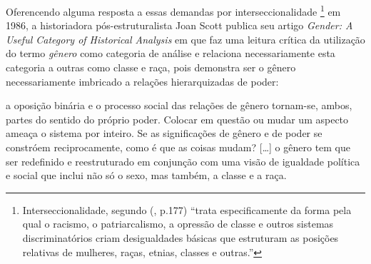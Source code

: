 
Oferencendo alguma resposta a essas demandas por interseccionalidade
\footnote{Interseccionalidade, segundo  (\citeyear{CRENSHAW2002}, p.177) ``trata especificamente da forma pela qual o racismo, o patriarcalismo, a opressão de classe e outros sistemas discriminatórios criam desigualdades básicas que estruturam as posições relativas de mulheres, raças, etnias, classes e outras.''} em 1986, a historiadora pós-estruturalista Joan Scott publica seu artigo \emph{Gender: A Useful Category of Historical Analysis} em que faz uma leitura crítica da utilização do termo \emph{gênero} como categoria de análise e relaciona necessariamente esta categoria a outras como classe e raça, pois demonstra ser o gênero necessariamente imbricado a relações hierarquizadas de poder:

\begin{citacao}
a oposição binária e o processo social das relações de gênero tornam-se,
ambos, partes do sentido do próprio poder. Colocar em questão ou mudar um aspecto ameaça o sistema por inteiro. Se as significações de gênero e de poder se constróem reciprocamente, como é que as coisas mudam? [\ldots] o gênero tem que ser redefinido e reestruturado em conjunção com uma visão de igualdade política e social que inclui não só o sexo, mas também, a classe e a raça. \cite[p.1073,1075]{SCOTT1986}
\end{citacao}


